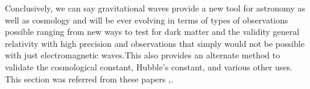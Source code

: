 \begin{enumerate}
    \hspace{1cm}Conclusively, we can say gravitational waves provide a new tool for astronomy as well as cosmology and will be ever evolving in terms of types of observations possible ranging from new ways to test for dark matter and the validity general relativity with high precision and observations that simply would not be possible with just electromagnetic waves.This also provides an alternate method to validate the cosmological constant, Hubble’s constant, and various other uses. This section was referred from these papers \cite{Schutz_1999},\cite{Mukherjee_2020}.

\end{enumerate}

\pagebreak
